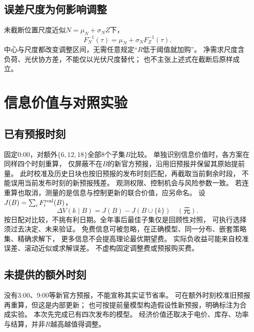 \documentclass[UTF8,11pt]{ctexart}
\begin{document}
\subsection{误差尺度为何影响调整}
未截断位置尺度近似$N=\mu_N+\sigma_NZ$下，
\begin{equation}
 F_N^{-1}(\tau)=\mu_N+\sigma_NF_Z^{-1}(\tau).
\end{equation}
中心与尺度都改变调整区间，无需任意规定“$R$低于阈值就加购”。
净需求尺度含负荷、光伏协方差，不能仅以光伏尺度替代；
也不主张上述式在截断后原样成立。

\section{信息价值与对照实验}
\subsection{已有预报时刻}
固定0:00，对额外$\{6,12,18\}$全部8个子集$B$比较。
单独识别信息价值时，各方案在同样四个时刻重算，
仅屏蔽不在$B$的新官方预报，沿用旧预报并保留其原始提前量。
此时校准及历史日块也按旧预报的发布时刻匹配，再截取当前剩余时段，
不能误用当前发布时刻的新预报残差。
观测权限、控制机会与风险参数一致。
若连重算也取消，测量的是信息与控制更新的联合价值，应另命名。
设$J(B)=\sum_iF_i^{\rm real}(B)$，
\begin{equation}
 \Delta V(k\mid B)=J(B)-J(B\cup\{k\})\quad(\text{元}).
\end{equation}
按日配对比较，不挑有利日期。全年事后最佳子集仅是回顾性对照，
可执行选择须过去决定、未来验证。
免费信息可被忽略，在正确模型、同一分布、嵌套策略集、精确求解下，
更多信息不会提高理论最优期望费。
实际负收益可能来自校准误差、滚动近似或求解误差。
不虚构固定调整费或预报购买费。

\subsection{未提供的额外时刻}
没有3:00、9:00等新官方预报，不能宣称其实证节省率。
可在额外时刻校准旧预报再重算，但这是内部更新；
也可按提前量模型构造假设性新预报，明确标注为合成实验。
本次先完成已有四次发布的模型。
经济价值还取决于电价、库存、功率与结算，并非$R$越高越值得调整。
\end{document}
